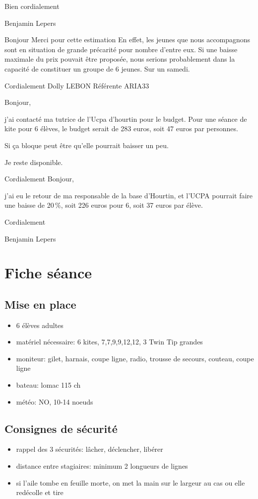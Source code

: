 \documentclass[11pt,a4paper]{report}
\begin{document}
Bien cordialement

Benjamin Lepers

\bigskip
Bonjour
Merci pour cette estimation
En effet, les jeunes que nous accompagnons sont en situation de grande
précarité pour nombre d'entre eux. Si une baisse maximale du prix
pouvait être proposée, nous serions probablement dans la capacité
de constituer un groupe de 6 jeunes. Sur un samedi.

Cordialement
Dolly LEBON
Référente ARIA33

\bigskip
Bonjour,

j'ai contacté ma tutrice de l'Ucpa d'hourtin pour le budget.
Pour une séance de kite  pour 6 élèves, le budget serait de 283 euros,
soit 47 euros par personnes.

Si ça bloque peut être qu'elle pourrait baisser un peu.


Je reste disponible.

Cordialement
\bigskip
Bonjour,

j'ai eu le retour de ma responsable de la base d'Hourtin, et l'UCPA
pourrait faire une baisse de 20\,\%, soit 226 euros pour 6, soit 37 euros
par élève.

Cordialement

Benjamin Lepers
\chapter{Fiche séance\label{fiche_seance}}
\section{Mise en place}
\begin{itemize}
\item 6 élèves adultes
\item matériel nécessaire: 6 kites, 7,7,9,9,12,12, 3 Twin Tip grandes
\item moniteur: gilet, harnais, coupe ligne, radio, trousse de secours, couteau, coupe ligne
\item bateau: lomac 115 ch
\item météo: NO, 10-14 noeuds
\end{itemize}
\section{Consignes de sécurité}
\begin{itemize}
\item rappel des 3 sécurités: lâcher, déclencher, libérer
\item distance entre stagiaires: minimum 2 longueurs de lignes
\item si l'aile tombe en feuille morte, on met la main sur le largeur au cas ou elle redécolle et tire
\end{itemize}
\end{document}
